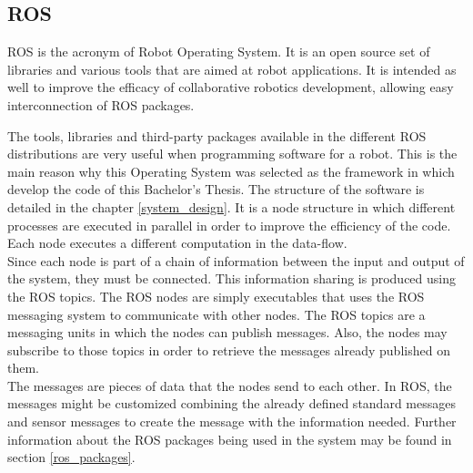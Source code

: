 	\subsection{ROS}
		\label{ros}

	ROS is the acronym of Robot Operating System\cite{ros}. It is an open source set of libraries and various tools that are aimed at robot applications. It is intended as well to improve the efficacy of collaborative robotics development, allowing easy interconnection of ROS packages. 



	The tools, libraries and third-party packages available in the different ROS distributions are very useful when programming software for a robot. This is the main reason why this Operating System was selected as the framework in which develop the code of this Bachelor's Thesis. 
	The structure of the software is detailed in the chapter \ref{system_design}.  It is a node structure in which different processes are executed in parallel in order to improve the efficiency of the code. Each node executes a different computation in the data-flow. 
	\\

	Since each node is part of a chain of information between the input and output of the system, they must be connected. This information sharing is produced using the ROS topics. 
	The ROS nodes are simply executables that uses the ROS messaging system to communicate with other nodes. The ROS topics are a messaging units in which the nodes can publish messages. Also, the nodes may subscribe to those topics in order to retrieve the messages already published on them. 
	\\
	The messages are pieces of data that the nodes send to each other. In ROS, the messages might be customized combining the already defined standard messages and sensor messages to create the message with the information needed. 
	Further information about the ROS packages being used in the system may be found in section \ref{ros_packages}.


